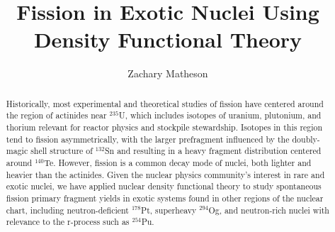 \documentclass{msuphddissertation}
\author{Zachary Matheson} %
\title{Fission in Exotic Nuclei Using Density Functional Theory} %
\newcommand{\Og}{$^{294}$Og}
\newcommand{\Pt}{$^{178}$Pt}
\begin{document}
\maketitlepage %


\begin{abstract}
Historically, most experimental and theoretical studies of fission have centered around the region of actinides near $^{235}$U, which includes isotopes of uranium, plutonium, and thorium relevant for reactor physics and stockpile stewardship. Isotopes in this region tend to fission asymmetrically, with the larger prefragment influenced by the doubly-magic shell structure of $^{132}$Sn and resulting in a heavy fragment distribution centered around $^{140}$Te. However, fission is a common decay mode of nuclei, both lighter and heavier than the actinides. Given the nuclear physics community's interest in rare and exotic nuclei, we have applied nuclear density functional theory to study spontaneous fission primary fragment yields in exotic systems found in other regions of the nuclear chart, including neutron-deficient {\Pt}, superheavy {\Og}, and neutron-rich nuclei with relevance to the r-process such as $^{254}$Pu.
\end{abstract}



\end{document}
